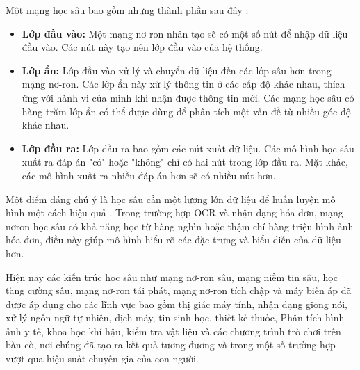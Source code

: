Một mạng học sâu bao gồm những thành phần sau đây \cite{aws-deep-learning}:
\begin{itemize}
    \item \textbf{Lớp đầu vào:} Một mạng nơ-ron nhân tạo sẽ có một số nút để nhập dữ liệu đầu vào. Các nút này tạo nên lớp đầu vào của hệ thống.
    \item \textbf{Lớp ẩn:} Lớp đầu vào xử lý và chuyển dữ liệu đến các lớp sâu hơn trong mạng nơ-ron. Các lớp ẩn này xử lý thông tin ở các cấp độ khác nhau, thích ứng với hành vi của mình khi nhận được thông tin mới. Các mạng học sâu có hàng trăm lớp ẩn có thể được dùng để phân tích một vấn đề từ nhiều góc độ khác nhau.
    \item \textbf{Lớp đầu ra:} Lớp đầu ra bao gồm các nút xuất dữ liệu. Các mô hình học sâu xuất ra đáp án "có" hoặc "không" chỉ có hai nút trong lớp đầu ra. Mặt khác, các mô hình xuất ra nhiều đáp án hơn sẽ có nhiều nút hơn. 
\end{itemize}

Một điểm đáng chú ý là học sâu cần một lượng lớn dữ liệu để huấn luyện mô hình một cách hiệu quả \cite{wiki-deep-learning}. Trong trường hợp OCR và nhận dạng hóa đơn, mạng nơron học sâu có khả năng học từ hàng nghìn hoặc thậm chí hàng triệu hình ảnh hóa đơn, điều này giúp mô hình hiểu rõ các đặc trưng và biểu diễn của dữ liệu hơn.

Hiện nay các kiến trúc học sâu như mạng nơ-ron sâu, mạng niềm tin sâu, học tăng cường sâu, mạng nơ-ron tái phát, mạng nơ-ron tích chập và máy biến áp đã được áp dụng cho các lĩnh vực bao gồm thị giác máy tính, nhận dạng giọng nói, xử lý ngôn ngữ tự nhiên, dịch máy, tin sinh học, thiết kế thuốc, Phân tích hình ảnh y tế, khoa học khí hậu, kiểm tra vật liệu và các chương trình trò chơi trên bàn cờ, nơi chúng đã tạo ra kết quả tương đương và trong một số trường hợp vượt qua hiệu suất chuyên gia của con người.

